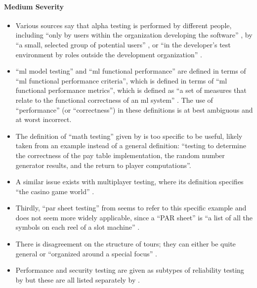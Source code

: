 \paragraph{Medium Severity}
\begin{itemize}\fi
      \item %
            Various sources say that alpha testing is performed by different
            people, including ``only by users within the organization
            developing the software'' \citep[p.~17]{IEEE2017}, by ``a small,
            selected group of potential users'' \citep[p.~5-8]{SWEBOK2024}, or
            ``in the developer's test environment by roles outside the
            development organization'' \citepISTQB{}.
      \item %
            ``\acf{ml} model testing'' and ``\acs{ml} functional performance''
            are defined in terms of ``\acs{ml} functional performance criteria'',
            which is defined in terms of ``\acs{ml} functional performance
            metrics'', which is defined as ``a set of measures that relate to the
            functional correctness of an \acs{ml} system'' \citepISTQB{}. The use
            of ``performance'' (or ``correctness'') in these definitions is at
            best ambiguous and at worst incorrect.
            \ifnotpaper
      \item %
            The definition of ``math testing'' given by \citetISTQB{} is
            too specific to be useful, likely taken from an example instead of
            a general definition: ``testing to determine the correctness of the
            pay table implementation, the random number generator results, and
            the return to player computations''.
      \item %
            A similar issue exists with multiplayer testing, where its
            definition specifies ``the casino game world'' \citepISTQB{}.
      \item %
            Thirdly, ``par sheet testing'' from \citepISTQB{} seems to
            refer to this specific example and does not seem more widely
            applicable, since a ``PAR sheet'' is ``a list of all the symbols
            on each reel of a slot machine'' \citep{Bluejay2024}.\fi
      \item %
            There is disagreement on the structure of tours; they can either be
            quite general \citep[p.~34]{IEEE2022} or ``organized around a
            special focus'' \citepISTQB{}.
      \item %
            Performance and security testing are given as subtypes of
            reliability testing by \citep{ISO_IEC2023a} but
            these are all listed separately by \citet[p.~53]{Firesmith2015}.
\end{itemize}

